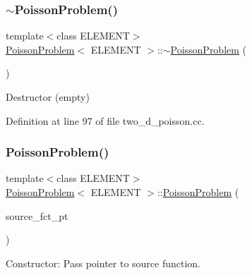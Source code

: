 \subsubsection{\texorpdfstring{$\sim$\+Poisson\+Problem()}{~PoissonProblem()}\hspace{0.1cm}{\footnotesize\ttfamily [1/3]}}
{\footnotesize\ttfamily template$<$class E\+L\+E\+M\+E\+NT$>$ \\
\hyperlink{classPoissonProblem}{Poisson\+Problem}$<$ E\+L\+E\+M\+E\+NT $>$\+::$\sim$\hyperlink{classPoissonProblem}{Poisson\+Problem} (\begin{DoxyParamCaption}{ }\end{DoxyParamCaption})\hspace{0.3cm}{\ttfamily [inline]}}



Destructor (empty) 



Definition at line 97 of file two\+\_\+d\+\_\+poisson.\+cc.

\mbox{\label{classPoissonProblem_a9c28346c473d246d8f61022365e742ea}} 
\subsubsection{\texorpdfstring{Poisson\+Problem()}{PoissonProblem()}\hspace{0.1cm}{\footnotesize\ttfamily [2/3]}}
{\footnotesize\ttfamily template$<$class E\+L\+E\+M\+E\+NT$>$ \\
\hyperlink{classPoissonProblem}{Poisson\+Problem}$<$ E\+L\+E\+M\+E\+NT $>$\+::\hyperlink{classPoissonProblem}{Poisson\+Problem} (\begin{DoxyParamCaption}\item[{Poisson\+Equations$<$ 2 $>$\+::Poisson\+Source\+Fct\+Pt}]{source\+\_\+fct\+\_\+pt }\end{DoxyParamCaption})}



Constructor\+: Pass pointer to source function. 

\mbox{\label{classPoissonProblem_ac247e42d2d292200617f4b9db7ed1ab8}} 

